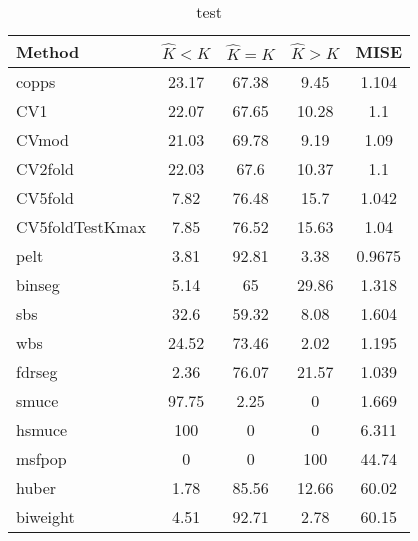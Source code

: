 \begin{table}[ht]
\centering
\begin{tabular}{l|cccc}
  \hline
Method & $\hat{K} < K$ & $\hat{K} = K$ & $\hat{K} > K$ & MISE \\ 
  \hline
copps & 23.17 & 67.38 &  9.45 & 1.104 \\ 
  CV1 & 22.07 & 67.65 & 10.28 &   1.1 \\ 
  CVmod & 21.03 & 69.78 &  9.19 &  1.09 \\ 
  CV2fold & 22.03 &  67.6 & 10.37 &   1.1 \\ 
  CV5fold &  7.82 & 76.48 &  15.7 & 1.042 \\ 
  CV5foldTestKmax &  7.85 & 76.52 & 15.63 &  1.04 \\ 
  pelt &  3.81 & 92.81 &  3.38 & 0.9675 \\ 
  binseg &  5.14 &    65 & 29.86 & 1.318 \\ 
  sbs &  32.6 & 59.32 &  8.08 & 1.604 \\ 
  wbs & 24.52 & 73.46 &  2.02 & 1.195 \\ 
  fdrseg &  2.36 & 76.07 & 21.57 & 1.039 \\ 
  smuce & 97.75 &  2.25 &     0 & 1.669 \\ 
  hsmuce &   100 &     0 &     0 & 6.311 \\ 
  msfpop &     0 &     0 &   100 & 44.74 \\ 
  huber &  1.78 & 85.56 & 12.66 & 60.02 \\ 
  biweight &  4.51 & 92.71 &  2.78 & 60.15 \\ 
   \hline
\end{tabular}
\caption{test} 
\end{table}
